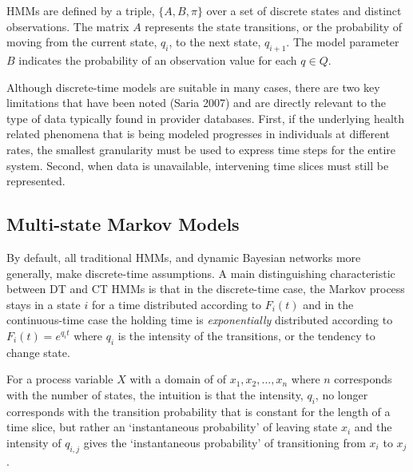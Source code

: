 \documentclass[letterpaper]{article}
\begin{document}
HMMs are defined by a triple, $\{ A, B, \pi \}$ over a set of discrete states and distinct observations.  The matrix $A$ represents the state transitions, or the probability of moving from the current state, $q_{i}$, to the next state, $q_{i+1}$. The model parameter $B$ indicates the probability of an observation value for each $q\in Q$.

Although discrete-time models are suitable in many cases, there are two key limitations that have been noted (Saria 2007) and are directly relevant to the type of data typically found in provider databases.  First, if the underlying health related phenomena that is being modeled progresses in individuals at different rates, the smallest granularity must be used to express time steps for the entire system.  Second, when data is unavailable, intervening time slices must still be represented.

\subsection{Multi-state Markov Models}
By default, all traditional HMMs, and dynamic Bayesian networks more generally, make discrete-time assumptions. A main distinguishing characteristic between DT and CT HMMs is that in the discrete-time case, the Markov process stays in a state $i$ for a time distributed according to $F_{i}(t)$ and in the continuous-time case the holding time is \emph{exponentially} distributed according to $F_{i}(t) = e^{q_{i}t}$ where $q_{i}$ is the intensity of the transitions, or the tendency to change state.

For a process variable $X$ with a domain of of ${x_1,x_2,...,x_n}$ where $n$ corresponds with the number of states, the intuition is that the intensity, $q_{i}$, no longer corresponds with the transition probability that is constant for the length of a time slice, but rather an `instantaneous probability' of leaving state $x_i$ and the intensity of $q_{i,j}$ gives the `instantaneous probability' of transitioning from $x_i$ to $x_j$.
\end{document}

